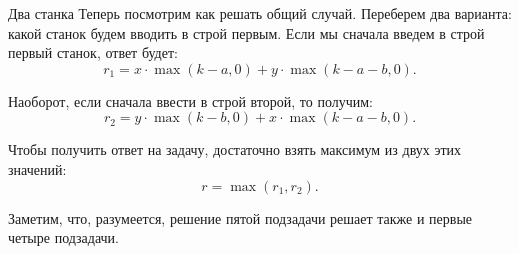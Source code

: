 \begin{tutorial}{Два станка}
Теперь посмотрим как решать общий случай. Переберем два варианта: какой станок будем вводить в строй первым. Если мы сначала введем в строй первый станок, ответ будет: 
$$r_1 = x \cdot \max(k - a, 0) + y \cdot \max(k - a - b, 0).$$ 

Наоборот, если сначала ввести в строй второй, то получим: 
$$r_2 = y \cdot \max(k - b, 0) + x \cdot \max(k - a - b, 0).$$ 

Чтобы получить ответ на задачу, достаточно взять максимум из двух этих значений:
$$r = \max(r_1, r_2).$$

Заметим, что, разумеется, решение пятой подзадачи решает также и первые четыре подзадачи.

\end{tutorial}
